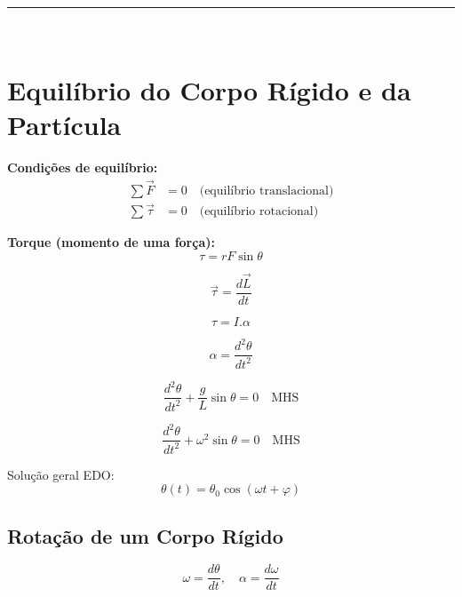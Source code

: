 \documentclass[a4paper,12pt]{article}
\begin{document}
\noindent\rule{\linewidth}{0.6pt}\\

\section*{Equilíbrio do Corpo Rígido e da Partícula}

\textbf{Condições de equilíbrio:}
\begin{align*}
  \sum \vec{F} &= 0 \quad \text{(equilíbrio translacional)} \\
  \sum \vec{\tau} &= 0 \quad \text{(equilíbrio rotacional)}
\end{align*}

\textbf{Torque (momento de uma força):}
\begin{equation*}
  \tau = r F \sin \theta
\end{equation*}

\begin{equation*}
  \vec{\tau} = \frac{d\vec{L}}{dt}
\end{equation*}

\begin{equation*}
  \tau = I.\alpha
\end{equation*}

\begin{equation*}
  \alpha = \frac{d^{2}\theta}{dt^{2}}
\end{equation*}

\begin{equation*}
  \frac{d^{2}\theta}{dt^{2}} + \frac{g}{L}\sin\theta = 0 \quad \textrm{MHS}
\end{equation*}

\begin{equation*}
  \frac{d^{2}\theta}{dt^{2}} + \omega^{2}\sin\theta = 0 \quad \textrm{MHS}
\end{equation*}

Solução geral EDO:
\begin{equation*}
  \theta(t) = \theta_{0} \cos(\omega t + \varphi)
\end{equation*}

\subsection*{Rota\c{c}\~ao de um Corpo R\'igido}
\begin{equation*}
  \omega = \frac{d\theta}{dt}, \quad \alpha = \frac{d\omega}{dt}
\end{equation*}
\end{document}
